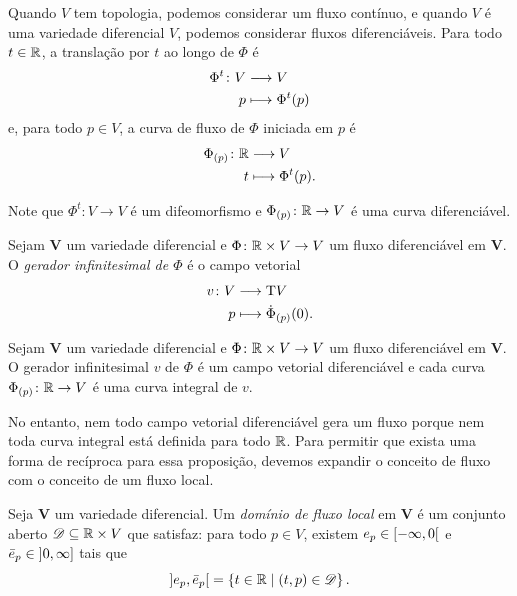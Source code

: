 Quando $V$ tem topologia, podemos considerar um fluxo contínuo, e quando $V$ é uma variedade diferencial $V$, podemos considerar fluxos diferenciáveis. Para todo $t \in \mathbb{R}$, a translação por $t$ ao longo de $\Phi$ é
	\begin{align*}
	{\Phi^t}\colon {V} &\longrightarrow {V} \\{p} &\longmapsto \Phi^t(p)
	\end{align*}
e, para todo $p \in V$, a curva de fluxo de $\Phi$ iniciada em $p$ é
	\begin{align*}
	{\Phi_{(p)}}\colon {\mathbb{R}} &\longrightarrow {V} \\{t} &\longmapsto \Phi^t(p).
	\end{align*}

Note que $\Phi^t\colon V \to V$ é um difeomorfismo e $\Phi_{(p)}\colon \mathbb{R} \to V$ é uma curva diferenciável.

\begin{definition}
Sejam $\bm V$ um variedade diferencial e $\Phi\colon \mathbb{R} \times V \to V$ um fluxo diferenciável em $\bm V$. O \emph{gerador infinitesimal de $\Phi$} é o campo vetorial
	\begin{align*}
	{v}\colon {V} &\longrightarrow {\mathrm{T}V} \\{p} &\longmapsto \dot \Phi_{(p)}(0).
	\end{align*}
\end{definition}

\begin{proposition}
Sejam $\bm V$ um variedade diferencial e $\Phi\colon \mathbb{R} \times V \to V$ um fluxo diferenciável em $\bm V$. O gerador infinitesimal $v$ de $\Phi$ é um campo vetorial diferenciável e cada curva $\Phi_{(p)}\colon \mathbb{R} \to V$ é uma curva integral de $v$.
\end{proposition}

No entanto, nem todo campo vetorial diferenciável gera um fluxo porque nem toda curva integral está definida para todo $\mathbb{R}$. Para permitir que exista uma forma de recíproca para essa proposição, devemos expandir o conceito de fluxo com o conceito de um fluxo local.

\begin{definition}
Seja $\bm V$ um variedade diferencial. Um \emph{domínio de fluxo local} em $\bm V$ é um conjunto aberto $\mathscr{D} \subseteq \mathbb{R} \times V$ que satisfaz: para todo $p \in V$, existem $e_p \in \left[{-\infty},{0}\right[$ e $\bar e_p \in \left]{0},{\infty}\right]$ tais que
	\begin{equation*}
	\left]{e_p},{\bar e_p}\right[ = \left\{{t \in \mathbb{R}}\;\middle\vert\;{(t,p) \in \mathscr{D}}\right\}.
	\end{equation*}
\end{definition}

